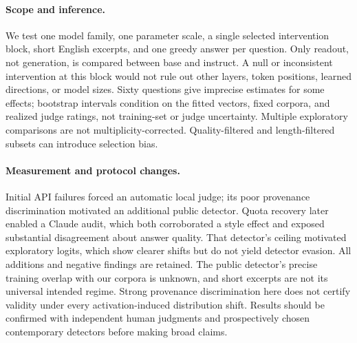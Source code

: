 \paragraph{Scope and inference.} We test one model family, one parameter scale, a single selected intervention block, short English excerpts, and one greedy answer per question. Only readout, not generation, is compared between base and instruct. A null or inconsistent intervention at this block would not rule out other layers, token positions, learned directions, or model sizes. Sixty questions give imprecise estimates for some effects; bootstrap intervals condition on the fitted vectors, fixed corpora, and realized judge ratings, not training-set or judge uncertainty. Multiple exploratory comparisons are not multiplicity-corrected. Quality-filtered and length-filtered subsets can introduce selection bias.

\paragraph{Measurement and protocol changes.} Initial API failures forced an automatic local judge; its poor provenance discrimination motivated an additional public detector. Quota recovery later enabled a Claude audit, which both corroborated a style effect and exposed substantial disagreement about answer quality. That detector's ceiling motivated exploratory logits, which show clearer shifts but do not yield detector evasion. All additions and negative findings are retained. The public detector's precise training overlap with our corpora is unknown, and short excerpts are not its universal intended regime. Strong provenance discrimination here does not certify validity under every activation-induced distribution shift. Results should be confirmed with independent human judgments and prospectively chosen contemporary detectors before making broad claims.
